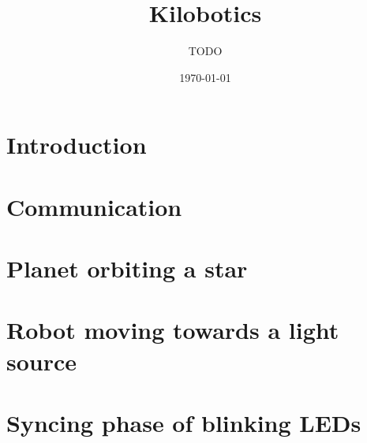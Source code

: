 \documentclass{article}
\title{Kilobotics}
\author{TODO}
\date{\today}
\begin{document}
\maketitle

\section{Introduction}

\section{Communication}

\section{Planet orbiting a star}

\section{Robot moving towards a light source}

\section{Syncing phase of blinking LEDs}
\end{document}
